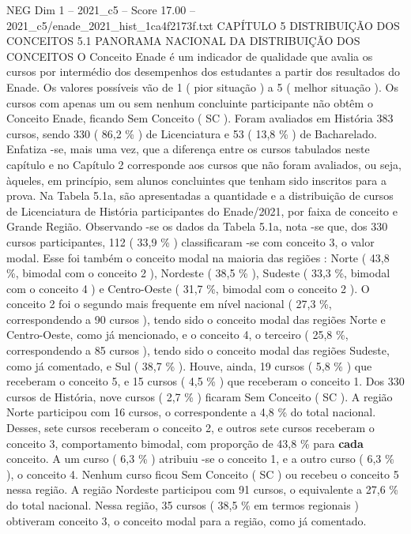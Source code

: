 \begin{textsample}{NEG Dim 1 – 2021\_c5 – Score 17.00 – 2021\_c5/enade\_2021\_hist\_1ca4f2173f.txt}  \label{ex:f1_neg_403}
CAPÍTULO 5 DISTRIBUIÇÃO DOS CONCEITOS 5.1 PANORAMA NACIONAL DA DISTRIBUIÇÃO DOS CONCEITOS O Conceito Enade é um indicador de qualidade que avalia os cursos por intermédio dos desempenhos dos estudantes a partir dos resultados do Enade.
Os valores possíveis vão de 1 ( pior situação ) a 5 ( melhor situação ).
Os cursos com apenas um ou sem nenhum concluinte participante não obtêm o Conceito Enade, ficando Sem Conceito ( SC ).
Foram avaliados em História 383 cursos, sendo 330 ( 86,2 \% ) de Licenciatura e 53 ( 13,8 \% ) de Bacharelado.
Enfatiza -se, mais uma vez, que a diferença entre os cursos tabulados neste capítulo e no Capítulo 2 corresponde aos cursos que não foram avaliados, ou seja, àqueles, em princípio, sem alunos concluintes que tenham sido inscritos para a prova.
Na Tabela 5.1a, são apresentadas a quantidade e a distribuição de cursos de Licenciatura de História participantes do Enade/2021, por faixa de conceito e Grande Região.
Observando -se os dados da Tabela 5.1a, nota -se que, dos 330 cursos participantes, 112 ( 33,9 \% ) classificaram -se com conceito 3, o valor modal.
Esse foi também o conceito modal na maioria das regiões : Norte ( 43,8 \%, bimodal com o conceito 2 ), Nordeste ( 38,5 \% ), Sudeste ( 33,3 \%, bimodal com o conceito 4 ) e Centro-Oeste ( 31,7 \%, bimodal com o conceito 2 ).
O conceito 2 foi o segundo mais frequente em nível nacional ( 27,3 \%, correspondendo a 90 cursos ), tendo sido o conceito modal das regiões Norte e Centro-Oeste, como já mencionado, e o conceito 4, o terceiro ( 25,8 \%, correspondendo a 85 cursos ), tendo sido o conceito modal das regiões Sudeste, como já comentado, e Sul ( 38,7 \% ).
Houve, ainda, 19 cursos ( 5,8 \% ) que receberam o conceito 5, e 15 cursos ( 4,5 \% ) que receberam o conceito 1.
Dos 330 cursos de História, nove cursos ( 2,7 \% ) ficaram Sem Conceito ( SC ).
A região Norte participou com 16 cursos, o correspondente a 4,8 \% do total nacional.
Desses, sete cursos receberam o conceito 2, e outros sete cursos receberam o conceito 3, comportamento bimodal, com proporção de 43,8 \% para \textbf{cada} conceito.
A um curso ( 6,3 \% ) atribuiu -se o conceito 1, e a outro curso ( 6,3 \% ), o conceito 4.
Nenhum curso ficou Sem Conceito ( SC ) ou recebeu o conceito 5 nessa região.
A região Nordeste participou com 91 cursos, o equivalente a 27,6 \% do total nacional.
Nessa região, 35 cursos ( 38,5 \% em termos regionais ) obtiveram conceito 3, o conceito modal para a região, como já comentado.

\end{textsample}
